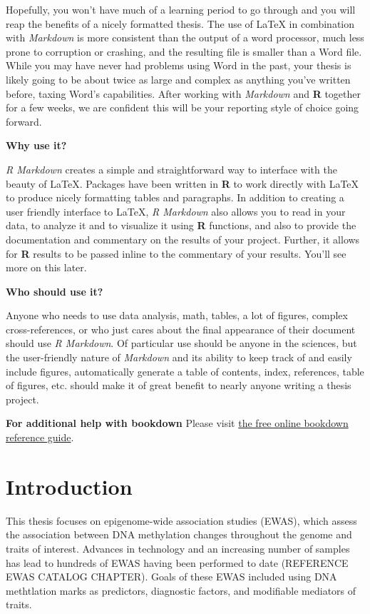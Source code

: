 \documentclass[11pt,twoside]{bristolthesis}
\begin{document}
Hopefully, you won't have much of a learning period to go through and you will reap the benefits of a nicely formatted thesis. The use of LaTeX in combination with \emph{Markdown} is more consistent than the output of a word processor, much less prone to corruption or crashing, and the resulting file is smaller than a Word file. While you may have never had problems using Word in the past, your thesis is likely going to be about twice as large and complex as anything you've written before, taxing Word's capabilities. After working with \emph{Markdown} and \textbf{R} together for a few weeks, we are confident this will be your reporting style of choice going forward.

\textbf{Why use it?}

\emph{R Markdown} creates a simple and straightforward way to interface with the beauty of LaTeX. Packages have been written in \textbf{R} to work directly with LaTeX to produce nicely formatting tables and paragraphs. In addition to creating a user friendly interface to LaTeX, \emph{R Markdown} also allows you to read in your data, to analyze it and to visualize it using \textbf{R} functions, and also to provide the documentation and commentary on the results of your project. Further, it allows for \textbf{R} results to be passed inline to the commentary of your results. You'll see more on this later.

\textbf{Who should use it?}

Anyone who needs to use data analysis, math, tables, a lot of figures, complex cross-references, or who just cares about the final appearance of their document should use \emph{R Markdown}. Of particular use should be anyone in the sciences, but the user-friendly nature of \emph{Markdown} and its ability to keep track of and easily include figures, automatically generate a table of contents, index, references, table of figures, etc. should make it of great benefit to nearly anyone writing a thesis project.

\textbf{For additional help with bookdown}
Please visit \href{https://bookdown.org/yihui/bookdown/}{the free online bookdown reference guide}.

\hypertarget{introduction}{%
\chapter{Introduction}\label{introduction}}

This thesis focuses on epigenome-wide association studies (EWAS), which assess the association between DNA methylation changes throughout the genome and traits of interest. Advances in technology and an increasing number of samples has lead to hundreds of EWAS having been performed to date (REFERENCE EWAS CATALOG CHAPTER). Goals of these EWAS included using DNA methtlation marks as predictors, diagnostic factors, and modifiable mediators of traits.
\end{document}
